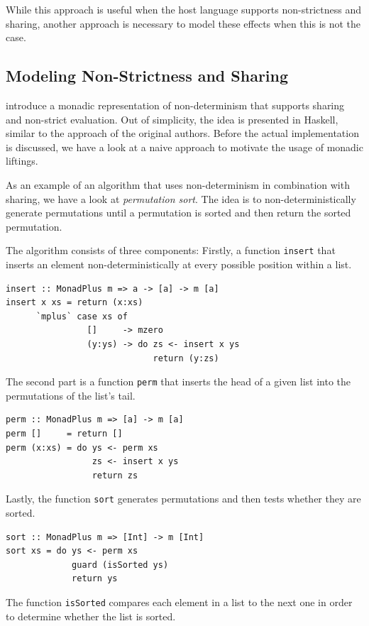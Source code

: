 \documentclass[a4paper, 11pt, fleqn, twoside, abstract=on]{scrreprt}
\newcommand{\hinl}[1]{\texttt{#1}}
\begin{document}
While this approach is useful when the host language supports non-strictness and sharing, another approach is necessary to model these effects when this is not the case.

\subsection{Modeling Non-Strictness and Sharing}
\label{subsec:monadicLifting}
\citet{fischer2009purely} introduce a monadic representation of non-determinism that supports sharing and non-strict evaluation.
Out of simplicity, the idea is presented in Haskell, similar to the approach of the original authors.
Before the actual implementation is discussed, we have a look at a naive approach to motivate the usage of monadic liftings.

As an example of an algorithm that uses non-determinism in combination with sharing, we have a look at \textit{permutation sort}.
The idea is to non-deterministically generate permutations until a permutation is sorted and then return the sorted permutation.

The algorithm consists of three components: Firstly, a function \hinl{insert} that inserts an element non-deterministically at every possible position within a list.

\begin{verbatim}
insert :: MonadPlus m => a -> [a] -> m [a]
insert x xs = return (x:xs)
      `mplus` case xs of
                []     -> mzero
                (y:ys) -> do zs <- insert x ys
                             return (y:zs)
\end{verbatim}
\noindent
The second part is a function \hinl{perm} that inserts the head of a given list into the permutations of the list's tail.

\begin{verbatim}
perm :: MonadPlus m => [a] -> m [a]
perm []     = return []
perm (x:xs) = do ys <- perm xs
                 zs <- insert x ys
                 return zs
\end{verbatim}
\noindent
Lastly, the function \hinl{sort} generates permutations and then tests whether they are sorted.

\begin{verbatim}
sort :: MonadPlus m => [Int] -> m [Int]
sort xs = do ys <- perm xs
             guard (isSorted ys)
             return ys
\end{verbatim}
\noindent
The function \hinl{isSorted} compares each element in a list to the next one in order to determine whether the list is sorted.
\end{document}
